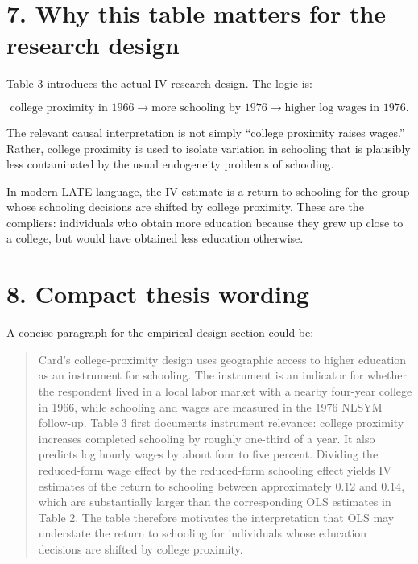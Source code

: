 \documentclass[11pt,a4paper]{article}
\begin{document}
\section*{7. Why this table matters for the research design}

Table 3 introduces the actual IV research design. The logic is:

\[
    \text{college proximity in 1966}
    \longrightarrow
    \text{more schooling by 1976}
    \longrightarrow
    \text{higher log wages in 1976}.
\]

The relevant causal interpretation is not simply ``college proximity raises wages.'' Rather, college proximity is used to isolate variation in schooling that is plausibly less contaminated by the usual endogeneity problems of schooling.

In modern LATE language, the IV estimate is a return to schooling for the group whose schooling decisions are shifted by college proximity. These are the compliers: individuals who obtain more education because they grew up close to a college, but would have obtained less education otherwise.

\section*{8. Compact thesis wording}

A concise paragraph for the empirical-design section could be:

\begin{quote}
Card's college-proximity design uses geographic access to higher education as an instrument for schooling. The instrument is an indicator for whether the respondent lived in a local labor market with a nearby four-year college in 1966, while schooling and wages are measured in the 1976 NLSYM follow-up. Table 3 first documents instrument relevance: college proximity increases completed schooling by roughly one-third of a year. It also predicts log hourly wages by about four to five percent. Dividing the reduced-form wage effect by the reduced-form schooling effect yields IV estimates of the return to schooling between approximately \(0.12\) and \(0.14\), which are substantially larger than the corresponding OLS estimates in Table 2. The table therefore motivates the interpretation that OLS may understate the return to schooling for individuals whose education decisions are shifted by college proximity.
\end{quote}
\end{document}
